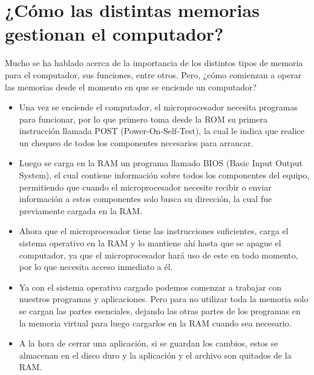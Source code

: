\documentclass{article}
\begin{document}
\section{¿Cómo las distintas memorias gestionan el computador?} \label{contenido}
Mucho se ha hablado acerca de la importancia de los distintos tipos de memoria para el computador, sus funciones, entre otros. Pero, ¿cómo comienzan a operar las memorias desde el momento en que se enciende un computador?
\begin{itemize}

\item Una vez se enciende el computador, el microprocesador necesita programas para funcionar, por lo que primero toma desde la ROM su primera instrucción llamada POST (Power-On-Self-Test), la cual le indica que realice un chequeo de todos los componentes necesarios para arrancar.

\item Luego se carga en la RAM un programa llamado BIOS (Basic Input Output System), el cual contiene información sobre todos los componentes del equipo, permitiendo que cuando el microprocesador necesite recibir o enviar información a estos componentes solo busca su dirección, la cual fue previamente cargada en la RAM.

\item Ahora que el microprocesador tiene las instrucciones suficientes, carga el sistema operativo en la RAM y lo mantiene ahí hasta que se apague el computador, ya que el microprocesador hará uso de este en todo momento, por lo que necesita acceso inmediato a él.

\item Ya con el sistema operativo cargado podemos comenzar a trabajar con nuestros programas y aplicaciones. Pero para no utilizar toda la memoria solo se cargan las partes esenciales, dejando las otras partes de los programas en la memoria virtual para luego cargarlos en la RAM cuando sea necesario.

\item A la hora de cerrar una aplicación, si se guardan los cambios, estos se almacenan en el disco duro y la aplicación y el archivo son quitados de la RAM. \cite{referencia}
 
\end{itemize}
\end{document}
